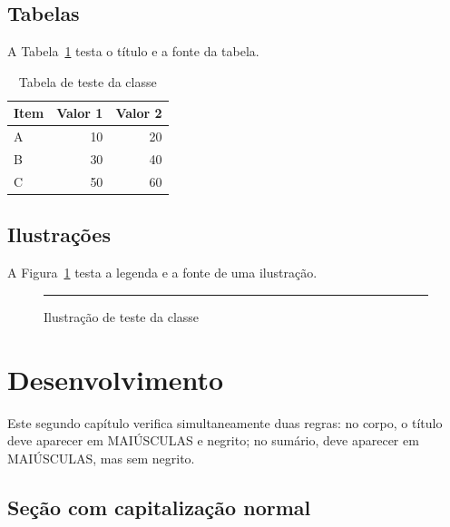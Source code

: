 \section{Tabelas}

A Tabela~\ref{tab:teste} testa o título e a fonte da tabela.

\begin{table}[htbp]
\centering
\caption{Tabela de teste da classe}
\label{tab:teste}
\begin{tabular}{lrr}
\hline
Item & Valor 1 & Valor 2 \\
\hline
A & 10 & 20 \\
B & 30 & 40 \\
C & 50 & 60 \\
\hline
\end{tabular}

\end{table}


\section{Ilustrações}

A Figura~\ref{fig:teste} testa a legenda e a fonte de uma ilustração.

\begin{figure}[htbp]
\centering
\rule{8cm}{4cm}
\caption{Ilustração de teste da classe}
\label{fig:teste}
\end{figure}


\chapter{Desenvolvimento}

Este segundo capítulo verifica simultaneamente duas regras:
no corpo, o título deve aparecer em MAIÚSCULAS e negrito; no sumário,
deve aparecer em MAIÚSCULAS, mas sem negrito.

\section{Seção com capitalização normal}

